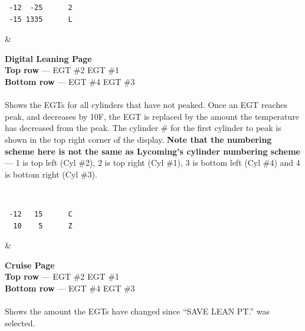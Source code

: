 \begin{longtable}
\begin{minipage}{\eistableleftcol}\ttfamily
  \begin{verbatim} -12  -25      2
 -15 1335      L
\end{verbatim}
\end{minipage}&
\begin{minipage}{\eistablerightcol}
\vspace{\tabletopspace}
\textbf{Digital Leaning Page }\\
\textbf{Top row} --- EGT \#2 EGT \#1\\
\textbf{Bottom row} --- EGT \#4 EGT \#3\\\\
Shows the EGTs for all cylinders that have not peaked. 
Once an EGT reaches peak, and decreases by 10\textdegree F, the EGT is replaced by the amount the temperature has
decreased from the peak. 
The cylinder \# for the first cylinder to peak is shown in the top right corner of the display. \textbf{Note that the
numbering scheme here is not the same as Lycoming's cylinder numbering scheme} --- 1 is top left (Cyl \#2), 2 is top right (Cyl \#1), 3 is bottom left (Cyl \#4) and 4 is bottom right (Cyl \#3). 
\vspace{\tablebottomspace}
\end{minipage}\\
\hline

\begin{minipage}{\eistableleftcol}\ttfamily
\begin{verbatim} -12   15      C
  10    5      Z\end{verbatim}
\end{minipage}&
\begin{minipage}{\eistablerightcol}
\vspace{\tabletopspace}
\vspace{.25ex}
\textbf{Cruise Page }\\
\textbf{Top row} --- EGT \#2 EGT \#1\\
\textbf{Bottom row} --- EGT \#4 EGT \#3\\\\
Shows the amount the EGTs have changed since ``SAVE LEAN PT.'' was selected.
\vspace{.25ex}
\vspace{\tablebottomspace}
\end{minipage}\\
\hline


\end{longtable}
